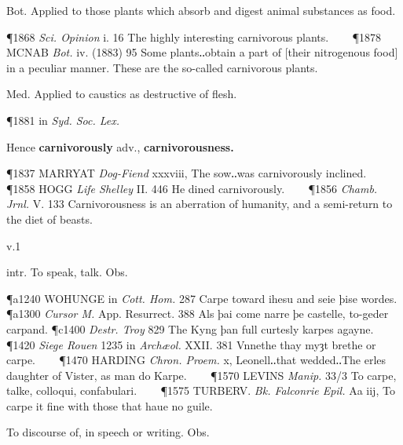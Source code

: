 \begin{description}[wide, labelwidth=!, labelindent=0pt]
\begin{myenumerate}
 Bot. Applied to those plants which absorb and digest animal substances as food.

\P 1868 \textit{Sci. Opinion} i. 16 The highly interesting carnivorous plants.    
\P 1878 MCNAB  \textit{Bot.} iv. (1883) 95 Some plants‥obtain a part of [their nitrogenous food] in a peculiar manner. These are the so-called carnivorous plants.

 Med. Applied to caustics as destructive of flesh.

\P 1881 in \textit{Syd. Soc. Lex.}

\vspace{0.1cm}\noindent
Hence \textbf{carnivorously} adv., \textbf{carnivorousness.}

\P 1837 MARRYAT  \textit{Dog-Fiend} xxxviii, The sow‥was carnivorously inclined.    
\P 1858 HOGG  \textit{Life Shelley} II. 446 He dined carnivorously.    
\P 1856 \textit{Chamb. Jrnl.} V. 133 Carnivorousness is an aberration of humanity, and a semi-return to the diet of beasts.
\end{myenumerate}


 v.1

\noindent {}

\vspace{-0.3cm}

\begin{myenumerate}

 intr. To speak, talk. Obs.

\P a1240 WOHUNGE in \textit{Cott. Hom.} 287 Carpe toward ihesu and seie þise wordes.
\P a1300  \textit{Cursor M.} App. Resurrect. 388 Als þai come narre þe castelle, to-geder carpand.
\P c1400  \textit{Destr. Troy} 829 The Kyng þan full curtesly karpes agayne.    
\P 1420 \textit{Siege Rouen} 1235 in \textit{Archæol.} XXII. 381 Vnnethe thay myȝt brethe or carpe.    
\P 1470 HARDING  \textit{Chron. Proem.} x, Leonell‥that wedded‥The erles daughter of Vister, as man do Karpe.    
\P 1570 LEVINS  \textit{Manip.} 33/3 To carpe, talke, colloqui, confabulari.    
\P 1575 TURBERV.  \textit{Bk. Falconrie Epil.} Aa iij, To carpe it fine with those that haue no guile.

 To discourse of, in speech or writing. Obs.


\end{myenumerate}
\end{description}

